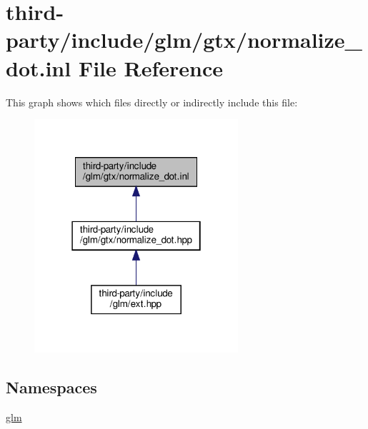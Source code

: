 \hypertarget{normalize__dot_8inl}{}\section{third-\/party/include/glm/gtx/normalize\+\_\+dot.inl File Reference}
\label{normalize__dot_8inl}
This graph shows which files directly or indirectly include this file\+:
\nopagebreak
\begin{figure}[H]
\begin{center}
\leavevmode
\includegraphics[width=214pt]{normalize__dot_8inl__dep__incl}
\end{center}
\end{figure}
\subsection*{Namespaces}
\begin{DoxyCompactItemize}
\item 
 \hyperlink{namespaceglm}{glm}
\end{DoxyCompactItemize}

